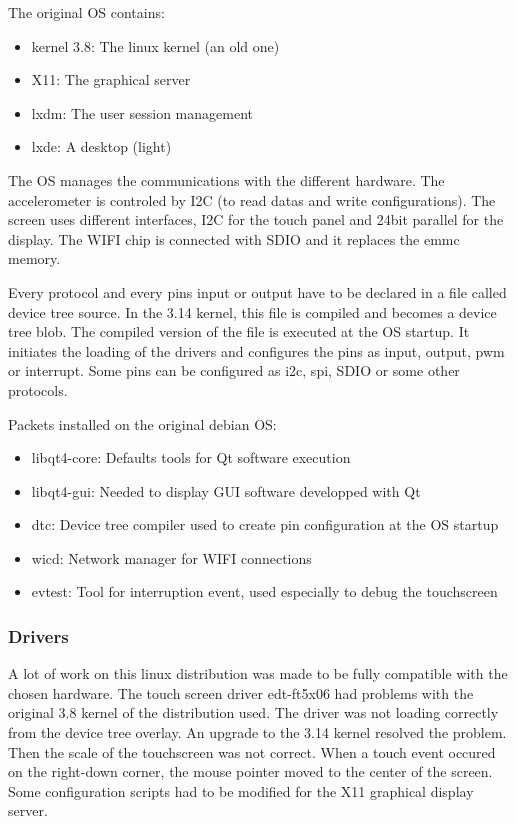 The original OS contains:
\begin{itemize}
\item{kernel 3.8: The linux kernel (an old one)}
\item{X11: The graphical server}
\item{lxdm: The user session management}
\item{lxde: A desktop (light)}
\end{itemize}

The OS manages the communications with the different hardware. The accelerometer is controled by I2C (to read datas and write configurations). The screen uses different interfaces, I2C for the touch panel and 24bit parallel for the display. The WIFI chip is connected with SDIO and it replaces the emmc memory.

Every protocol and every pins input or output have to be declared in a file called device tree source. In the 3.14 kernel, this file is compiled and becomes a device tree blob. The compiled version of the file is executed at the OS startup. It initiates the loading of the drivers and configures the pins as input, output, pwm or interrupt. Some pins can be configured as i2c, spi, SDIO or some other protocols.


Packets installed on the original debian OS:
\begin{itemize}
\item{libqt4-core: Defaults tools for Qt software execution}
\item{libqt4-gui: Needed to display GUI software developped with Qt}
\item{dtc: Device tree compiler used to create pin configuration at the OS startup}
\item{wicd: Network manager for WIFI connections}
\item{evtest: Tool for interruption event, used especially to debug the touchscreen}
\end{itemize}


\subsubsection{Drivers}
A lot of work on this linux distribution was made to be fully compatible with the chosen hardware.
The touch screen driver edt-ft5x06 had problems with the original 3.8 kernel of the distribution used. The driver was not loading correctly from the device tree overlay. An upgrade to the 3.14 kernel resolved the problem.
Then the scale of the touchscreen was not correct.
When a touch event occured on the right-down corner, the mouse pointer moved to the center of the screen. Some configuration scripts had to be modified for the X11 graphical display server.

